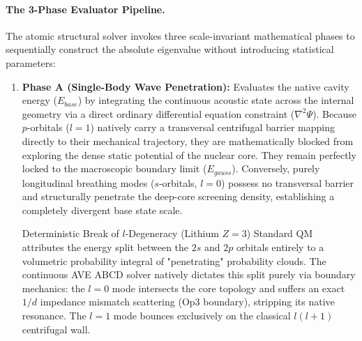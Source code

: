\paragraph{The 3-Phase Evaluator Pipeline.}
The atomic structural solver invokes three scale-invariant mathematical phases to sequentially construct the absolute eigenvalue without introducing statistical parameters:
\begin{enumerate}
    \item \textbf{Phase A (Single-Body Wave Penetration):} Evaluates the native cavity energy ($E_{base}$) by integrating the continuous acoustic state across the internal geometry via a direct ordinary differential equation constraint ($\nabla^2 \Psi$). Because $p$-orbitals ($l=1$) natively carry a transversal centrifugal barrier mapping directly to their mechanical trajectory, they are mathematically blocked from exploring the dense static potential of the nuclear core. They remain perfectly locked to the macroscopic boundary limit ($E_{gauss}$). Conversely, purely longitudinal breathing modes ($s$-orbitals, $l=0$) possess no transversal barrier and structurally penetrate the deep-core screening density, establishing a completely divergent base state scale.

\begin{resultbox}{Deterministic Break of $l$-Degeneracy (Lithium $Z=3$)}
Standard QM attributes the energy split between the $2s$ and $2p$ orbitals entirely to a volumetric probability integral of "penetrating" probability clouds. The continuous AVE ABCD solver natively dictates this split purely via boundary mechanics: the $l=0$ mode intersects the core topology and suffers an exact $1/d$ impedance mismatch scattering (Op3 boundary), stripping its native resonance. The $l=1$ mode bounces exclusively on the classical $l(l+1)$ centrifugal wall.


\end{resultbox}
\end{enumerate}

